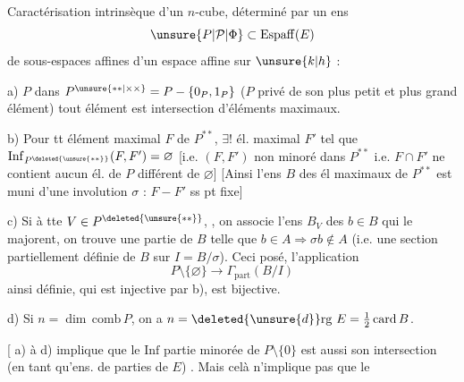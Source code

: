Caractérisation intrinsèque d'un $n$-cube, déterminé par un ens
\[
\unsure{P|\mathcal P|\Phi}\subset\mathrm{Espaff}(E)
\]
de sous-espaces affines d'un espace affine sur $\unsure{k|h}$ :

a) $P$ 
dans $P^{\unsure{**|\times\times}}=P-\{0_P,1_P\}$ ($P$ privé de son plus
petit et plus grand élément) tout élément est
intersection  d'éléments maximaux.

b) Pour tt élément maximal $F$ de $P^{**}$, $\exists!$
él. maximal $F'$ tel que $\mathrm{Inf}_{P^{\deleted{\unsure{**}}}}(F,F')=\varnothing$ [i.e.
$(F,F')$ non minoré dans $P^{**}$ i.e. $F\cap F'$ ne contient
aucun él. de $P$ différent de $\varnothing$] [Ainsi l'ens
$B$ des él maximaux de $P^{**}$ est muni d'une involution $\sigma$ :
$F-F'$ ss pt fixe]

c) Si à tte $V\in P^{\deleted{\unsure{**}}}$, , on associe l'ens  $B_V$
des $b\in B$ qui le majorent, on trouve
une partie  de $B$ telle que $b\in A\Longrightarrow\sigma b\notin A$
(i.e. une section partiellement définie de $B$
sur $I=B/\sigma$). Ceci posé, l'application
\[
P\setminus\{\varnothing\}\longrightarrow\Gamma_{\mathrm{part}}(B/I)
\]
ainsi définie, qui est injective par b), est bijective.

d) Si $n=\dim\,\mathrm{comb}\,P$, on a  $n=\deleted{\unsure{d}}\mathrm{rg}\ E
=\frac12\operatorname{card} B$.

[ a) à d) implique que 
le $\mathrm{Inf}$  
partie minorée de $P\setminus\{0\}$ est aussi son
intersection (en tant qu'ens. de parties
de $E$) . Mais celà n'implique pas que le
